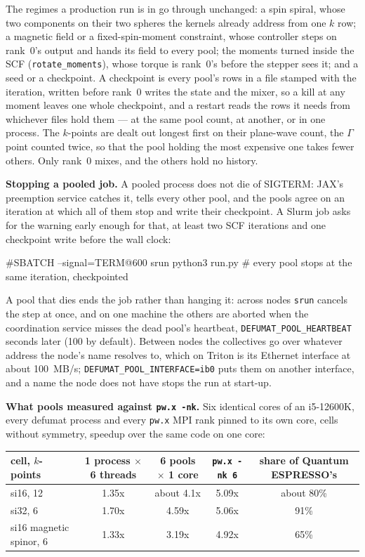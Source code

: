 \documentclass[11pt,a4paper]{article}
\newcommand{\qe}{Quantum ESPRESSO}
\newcommand{\code}[1]{\texttt{\small #1}}
\begin{document}
The regimes a production run is in go through unchanged: a spin spiral, whose
two components on their two spheres the kernels already address from one $k$
row; a magnetic field or a fixed-spin-moment constraint, whose controller steps
on rank~0's output and hands its field to every pool; the moments turned inside
the SCF (\code{rotate\_moments}), whose torque is rank~0's before the stepper
sees it; and a seed or a checkpoint. A checkpoint is every pool's rows in a file
stamped with the iteration, written before rank~0 writes the state and the
mixer, so a kill at any moment leaves one whole checkpoint, and a restart reads
the rows it needs from whichever files hold them --- at the same pool count, at
another, or in one process. The $k$-points are dealt out longest first on their
plane-wave count, the $\Gamma$ point counted twice, so that the pool holding the
most expensive one takes fewer others. Only rank~0 mixes, and the others hold no
history.

\textbf{Stopping a pooled job.} A pooled process does not die of SIGTERM: JAX's
preemption service catches it, tells every other pool, and the pools agree on an
iteration at which all of them stop and write their checkpoint. A Slurm job asks
for the warning early enough for that, at least two SCF iterations and one
checkpoint write before the wall clock:

\begin{shcode}
#SBATCH --signal=TERM@600
srun python3 run.py            # every pool stops at the same iteration, checkpointed
\end{shcode}

\noindent A pool that dies ends the job rather than hanging it: across nodes
\code{srun} cancels the step at once, and on one machine the others are aborted
when the coordination service misses the dead pool's heartbeat,
\code{DEFUMAT\_POOL\_HEARTBEAT} seconds later (100 by default). Between nodes the
collectives go over whatever address the node's name resolves to, which on
Triton is its Ethernet interface at about 100~MB/s;
\code{DEFUMAT\_POOL\_INTERFACE=ib0} puts them on another interface, and a name the
node does not have stops the run at start-up.

\textbf{What pools measured against \code{pw.x -nk}.} Six identical cores of an
i5-12600K, every defumat process and every \code{pw.x} MPI rank pinned to its own
core, cells without symmetry, speedup over the same code on one core:

\begin{center}
\begin{tabular}{lcccc}
\toprule
cell, $k$-points & 1 process $\times$ 6 threads & 6 pools $\times$ 1 core & \code{pw.x -nk 6} & share of \qe's \\
\midrule
si16, 12 & 1.35x & about 4.1x & 5.09x & about 80\% \\
si32, 6 & 1.70x & 4.59x & 5.06x & 91\% \\
si16 magnetic spinor, 6 & 1.33x & 3.19x & 4.92x & 65\% \\
\bottomrule
\end{tabular}
\end{center}
\end{document}
